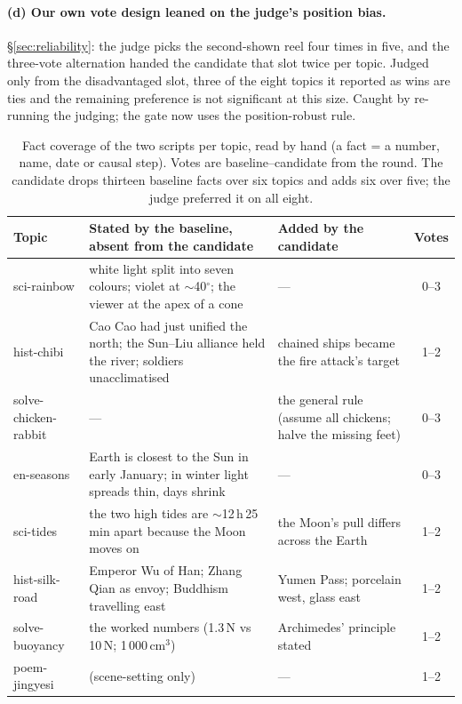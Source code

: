 \documentclass[11pt]{article}
\begin{document}
\paragraph{(d) Our own vote design leaned on the judge's position bias.} \S\ref{sec:reliability}: the
judge picks the second-shown reel four times in five, and the three-vote alternation handed the
candidate that slot twice per topic. Judged only from the disadvantaged slot, three of the eight topics it reported as wins are ties and
the remaining preference is not significant at this size. Caught by re-running the judging; the gate
now uses the position-robust rule.

\begin{table}[t]
\centering\small
\begin{tabular}{lp{6.2cm}p{4.6cm}c}
\toprule
Topic & Stated by the baseline, absent from the candidate & Added by the candidate & Votes \\
\midrule
sci-rainbow & white light split into seven colours; violet at $\sim$40$^\circ$; the viewer at the apex of a cone & --- & 0--3 \\
hist-chibi & Cao Cao had just unified the north; the Sun--Liu alliance held the river; soldiers unacclimatised & chained ships became the fire attack's target & 1--2 \\
solve-chicken-rabbit & --- & the general rule (assume all chickens; halve the missing feet) & 0--3 \\
en-seasons & Earth is closest to the Sun in early January; in winter light spreads thin, days shrink & --- & 0--3 \\
sci-tides & the two high tides are $\sim$12\,h\,25\,min apart because the Moon moves on & the Moon's pull differs across the Earth & 1--2 \\
hist-silk-road & Emperor Wu of Han; Zhang Qian as envoy; Buddhism travelling east & Yumen Pass; porcelain west, glass east & 1--2 \\
solve-buoyancy & the worked numbers (1.3\,N vs 10\,N; 1\,000\,cm$^3$) & Archimedes' principle stated & 1--2 \\
poem-jingyesi & (scene-setting only) & --- & 1--2 \\
\bottomrule
\end{tabular}
\caption{Fact coverage of the two scripts per topic, read by hand (a fact = a number, name, date or
causal step). Votes are baseline--candidate from the round. The candidate drops thirteen baseline facts
over six topics and adds six over five; the judge preferred it on all eight.}
\label{tab:facts}
\end{table}
\end{document}
